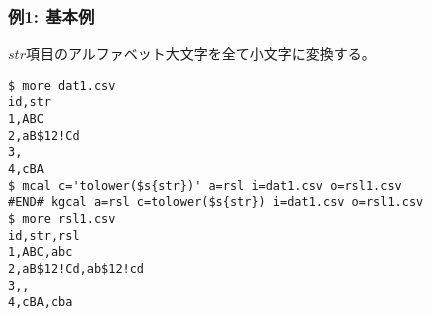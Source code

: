 \subsubsection*{例1: 基本例}

$str$項目のアルファベット大文字を全て小文字に変換する。


\begin{Verbatim}[baselinestretch=0.7,frame=single]
$ more dat1.csv
id,str
1,ABC
2,aB$12!Cd
3,
4,cBA
$ mcal c='tolower($s{str})' a=rsl i=dat1.csv o=rsl1.csv
#END# kgcal a=rsl c=tolower($s{str}) i=dat1.csv o=rsl1.csv
$ more rsl1.csv
id,str,rsl
1,ABC,abc
2,aB$12!Cd,ab$12!cd
3,,
4,cBA,cba
\end{Verbatim}
